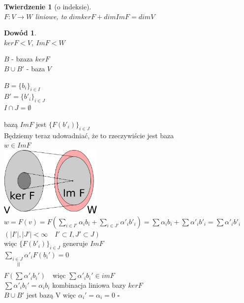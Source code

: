 \documentclass[12pt,a4paper]{article}
\renewcommand{\qed}{$\square$}
\theoremstyle{plain}
\newtheorem{tw}{Twierdzenie}[section]
\theoremstyle{definition}
\theoremstyle{definition}
\theoremstyle{definition}
\theoremstyle{definition}
\newtheorem*{dd}{Dowód}
\theoremstyle{definition}
\theoremstyle{definition}
\theoremstyle{definition}
\theoremstyle{definition}
\theoremstyle{definition}
\begin{document}
\begin{tw}[o indeksie]
    ~\\
    $F: V \rightarrow W $ liniowe, to $dimker F + dimIm F = dim V$
\end{tw}
\newpage
\begin{dd}
    ~\\
    $ker F < V,\  Im F < W$ \\
    \begin{minipage}[c]{0.5\textwidth}
        $B$ - bzaza $ker F$ \\
        $ B \cup B' $ - baza $V$
    \end{minipage}%
    \begin{minipage}[c]{0.5\textwidth}
        $B = \{b_i\}_{i \in I}$ \\
        $B' = \{b'_i\}_{i \in J}$ \\
        $I \cap J = \emptyset $
    \end{minipage}
    bazą $Im F$ jest $\{F(b'_i)\}_{i \in J}$ \\
    Będziemy teraz udowadniać, że to rzeczywiście jest baza\\
    $w \in Im F$ \\
	\includegraphics[width=5cm]{wyklad3_obrazek} \\ %

    $w = F(v) = F(\sum\limits_{i \in I'} \alpha_i b_i + \sum\limits_{i \in J'} \alpha'_i b'_i) = \sum\alpha_i b_i + \sum\alpha'_i b'_i = \sum\alpha'_i b'_i $\\
    $(|I'|, |J'|<\infty \quad I'\subset I, J'\subset J)$\\
    więc $\{F(b'_i)\}_{i \in J} $ generuje $ImF$ \\
    $\sum\limits_{i\in J} \alpha'_i F(b_i') = 0$\\
    $\qquad \rotatebox{90}{$\,=$}$\\%
    $F(\sum \alpha'_i b_i') \quad $więc $ \sum \alpha'_i b_i' \in imF$\\
    $\sum \alpha'_i b_i' =\alpha_i b_i$ \quad kombinacja liniowa bazy $kerF$\\
    $B\cup B'$ jest bazą V więc $\alpha_i' = \alpha_i = 0$ \quad \qed
\end{dd} 
\end{document}
